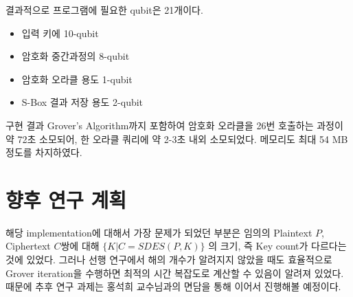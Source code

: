 \documentclass{article}
\theoremstyle{break}
\begin{document}
    결과적으로 프로그램에 필요한 qubit은 21개이다.
    \begin{itemize}
        \item 입력 키에 10-qubit
        \item 암호화 중간과정의 8-qubit
        \item 암호화 오라클 용도 1-qubit
        \item S-Box 결과 저장 용도 2-qubit
    \end{itemize}
    구현 결과 Grover's Algorithm까지 포함하여 암호화 오라클을 26번 호출하는 과정이 약 72초 소모되어, 한 오라클 쿼리에 약 2-3초 내외 소모되었다. 메모리도 최대 54 MB 정도를 차지하였다.
    
	\section{향후 연구 계획}
	
	해당 implementation에 대해서 가장 문제가 되었던 부분은 임의의 Plaintext $P$, Ciphertext $C$쌍에 대해 $\{K|C=SDES(P,K)\}$ 의 크기, 즉 Key count가 다르다는 것에 있었다. 그러나 선행 연구에서 해의 개수가 알려지지 않았을 때도 효율적으로 Grover iteration을 수행하면 최적의 시간 복잡도로 계산할 수 있음이 알려져 있었다. 때문에 추후 연구 과제는 홍석희 교수님과의 면담을 통해 이어서 진행해볼 예정이다.
	
\end{document}
